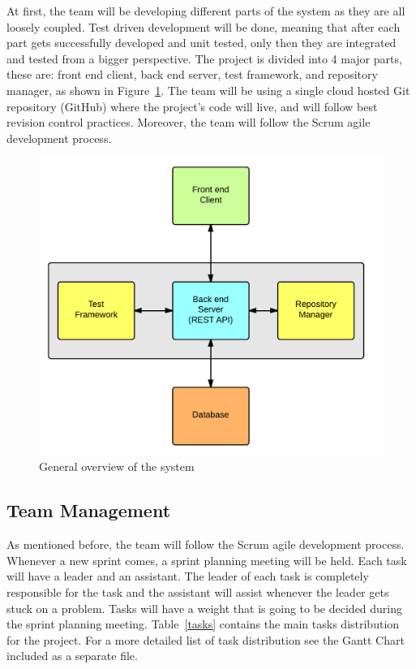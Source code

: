 
At first, the team will be developing different parts of
the system as they are all loosely coupled. Test driven development will be
done, meaning that after each part gets successfully developed and unit tested,
only then they are integrated and tested from a bigger perspective. The project
is divided into 4 major parts, these are: front end client, back end server,
test framework, and repository manager, as shown in Figure~\ref{arqu}. The team
will be using a single cloud hosted Git repository (GitHub) where the project's
code will live, and will follow best revision control practices. Moreover, the
team will follow the Scrum agile development process.

\begin{figure}[H]
	\centering
	\includegraphics[width=\textwidth]{img/bigArquitectOverview}
	\caption{General overview of the system\label{arqu}}
\end{figure}

\subsection{Team Management}

As mentioned before, the team will follow the Scrum agile development process. Whenever a new sprint comes, a sprint planning meeting will be held. Each task will have a leader
and an assistant. The leader of each task is completely responsible for the task
and the assistant will assist whenever the leader gets stuck on a problem. Tasks will have a weight that is going to be decided during the sprint planning meeting. Table~\ref{tasks} contains the main tasks distribution for the project. For a more detailed list of
task distribution see the
Gantt Chart included as a separate file.

